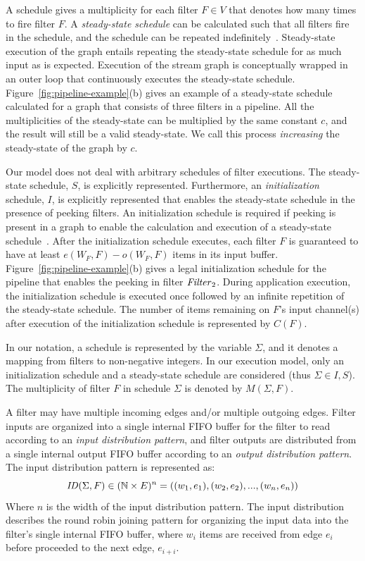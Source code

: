 A schedule gives a multiplicity for each filter $F \in V$ that denotes
how many times to fire filter $F$. A {\it steady-state schedule} can
be calculated such that all filters fire in the schedule, and the
schedule can be repeated indefinitely~\cite{lee87}.  Steady-state
execution of the graph entails repeating the steady-state schedule for
as much input as is expected.  Execution of the stream graph is
conceptually wrapped in an outer loop that continuously executes the
steady-state schedule.  Figure~\ref{fig:pipeline-example}(b) gives an
example of a steady-state schedule calculated for a graph that
consists of three filters in a pipeline.  All the multiplicities of
the steady-state can be multiplied by the same constant $c$, and the
result will still be a valid steady-state.  We call this process {\it
  increasing} the steady-state of the graph by $c$.

Our model does not deal with arbitrary schedules of filter executions.
The steady-state schedule, $S$, is explicitly represented.
Furthermore, an {\it initialization} schedule, $I$, is explicitly
represented that enables the steady-state schedule in the presence of
peeking filters.  An initialization schedule is required if peeking is
present in a graph to enable the calculation and execution of a
steady-state schedule~\cite{karczmarek-lctes03}.  After the initialization
schedule executes, each filter $F$ is guaranteed to have at least
$e(W_F, F) - o(W_F, F)$ items in its input buffer.
Figure~\ref{fig:pipeline-example}(b) gives a legal initialization
schedule for the pipeline that enables the peeking in filter
$\relax{\it Filter}_2$.  During application execution, the initialization
schedule is executed once followed by an infinite repetition of the
steady-state schedule.  The number of items remaining on $F$'s input
channel(s) after execution of the initialization schedule is
represented by $C(F)$.

In our notation, a schedule is represented by the variable $\Sigma$,
and it denotes a mapping from filters to non-negative integers. In our
execution model, only an initialization schedule and a steady-state
schedule are considered (thus $\Sigma \in I,S$). The
multiplicity of filter $F$ in schedule $\Sigma$ is denoted by
$M(\Sigma, F)$.  

A filter may have multiple incoming edges and/or multiple outgoing
edges.  Filter inputs are organized into a single internal FIFO buffer for the
filter to read according to an {\it input distribution pattern}, and
filter outputs are distributed from a single internal output FIFO
buffer according to an {\it output distribution pattern}.   
The input distribution pattern is represented as:
{\ninepoint
\[ \relax{\it ID}(\Sigma, F) \in (\mathbb{N} \times E)^n = ((w_1,e_1), (w_2,
e_2), ..., (w_n, e_n))\]
}
\noindent Where $n$ is the width of the input distribution pattern.
The input distribution describes the round robin joining pattern for
organizing the input data into the filter's single internal FIFO
buffer, where $w_i$ items are received from edge $e_i$ before
proceeded to the next edge, $e_{i+i}$.

